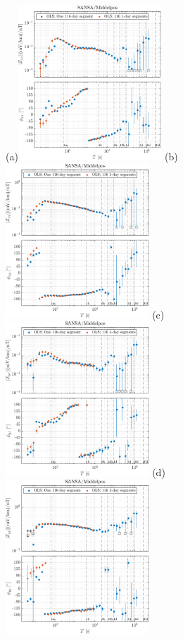 \documentclass[draft,linenumbers]{agujournal2018}
\begin{document}
\begin{figure}
  
  \subfigure(a){\includegraphics[width=0.48\textwidth]{figures/zplot-magnitude_phase-Middelpos-tf1-Z_xx.pdf}} 
  \subfigure(b){\includegraphics[width=0.48\textwidth]{figures/zplot-magnitude_phase-Middelpos-tf1-Z_xy.pdf}} 
  \subfigure(c){\includegraphics[width=0.48\textwidth]{figures/zplot-magnitude_phase-Middelpos-tf1-Z_yx.pdf}} 
  \subfigure(d){\includegraphics[width=0.48\textwidth]{figures/zplot-magnitude_phase-Middelpos-tf1-Z_yy.pdf}} 


\end{figure}
\end{document}
